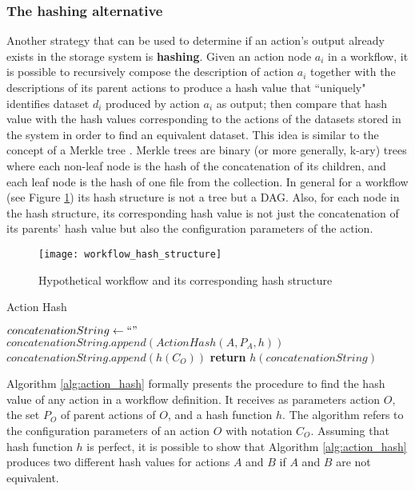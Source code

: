 \subsubsection{The hashing alternative}
\label{sec:encryption}
Another strategy that can be used to determine if an action's output already exists in the storage system is \textbf{hashing}.  Given an action node $a_i$ in a workflow, it is possible to recursively compose the description of action $a_i$ together with the descriptions of its parent actions to produce a hash value that ``uniquely" identifies dataset $d_i$ produced by action $a_i$ as output; then compare that hash value with the hash values corresponding to the actions of the datasets stored in the system in order to find an equivalent dataset. This idea is similar to the concept of a Merkle tree \citep{merkle1990certified}. Merkle trees are binary (or more generally, k-ary) trees where each non-leaf node is the hash of the concatenation of its children, and each leaf node is the hash of one file from the collection.  In general for a workflow (see Figure \ref{fig:hash_structure}) its hash structure is not a tree but a DAG.  Also, for each node in the hash structure, its corresponding hash value is not just the concatenation of its parents' hash value but also the configuration parameters of the action.  


\begin{figure}
\centering
\texttt{[image: workflow\_hash\_structure]}
\caption{Hypothetical workflow and its corresponding hash structure}
\label{fig:hash_structure}
\end{figure}

\begin{algorithm}
\begin{singlespace}
\caption{Action Hash}
\label{alg:action_hash}
\begin{algorithmic}[1]
        \State $concatenationString \gets ``"$
               \State $concatenationString.append(ActionHash(A, P_A, h))$
        \EndFor
        \State $concatenationString.append(h(C_O))$
        \State \textbf{return} $h(concatenationString)$
\EndProcedure
\end{algorithmic}
\end{singlespace}
\end{algorithm}

Algorithm \ref{alg:action_hash} formally presents the procedure to find the hash value of any action in a workflow definition. It receives as parameters action $O$, the set $P_O$ of parent actions of $O$, and a hash function $h$. The algorithm refers to the configuration parameters of an action $O$ with notation $C_O$. Assuming that hash function $h$ is perfect, it is possible to show that Algorithm \ref{alg:action_hash} produces two different hash values for actions $A$ and $B$ if $A$ and $B$ are not equivalent.  

